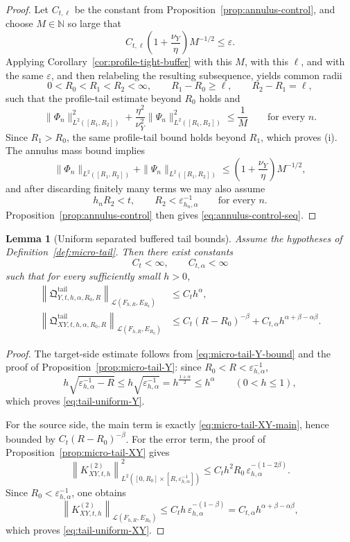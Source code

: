 \documentclass[11pt,a4paper]{amsart}
\theoremstyle{plain}
\newtheorem{lemma}[theorem]{Lemma}
\theoremstyle{definition}
\theoremstyle{remark}
\begin{document}
\begin{proof}
Let \(C_{t,\ell}\) be the constant from Proposition~\ref{prop:annulus-control}, and
choose \(M\in\mathbb N\) so large that
\[
C_{t,\ell}\left(1+\frac{\nu_Y}{\eta}\right)M^{-1/2}\le \varepsilon.
\]
Applying Corollary~\ref{cor:profile-tight-buffer} with this \(M\), with this \(\ell\), and with the
same \(\varepsilon\), and then relabeling the resulting subsequence, yields common radii
\[
0<R_0<R_1<R_2<\infty,
\qquad
R_1-R_0\ge \ell,
\qquad
R_2-R_1=\ell,
\]
such that the profile-tail estimate beyond \(R_0\) holds and
\[
\|\Phi_n\|_{L^2([R_1,R_2])}^2
+
\frac{\eta^2}{\nu_Y^2}
\|\Psi_n\|_{L^2([R_1,R_2])}^2
\le
\frac{1}{M}
\qquad\text{for every }n.
\]
Since \(R_1>R_0\), the same profile-tail bound holds beyond \(R_1\), which proves (i). The
annulus mass bound implies
\[
\|\Phi_n\|_{L^2([R_1,R_2])}
+
\|\Psi_n\|_{L^2([R_1,R_2])}
\le
\left(1+\frac{\nu_Y}{\eta}\right)M^{-1/2},
\]
and after discarding finitely many terms we may also assume
\[
h_nR_2<t,
\qquad
R_2<\varepsilon_{h_n,\alpha}^{-1}
\qquad\text{for every }n.
\]
Proposition~\ref{prop:annulus-control} then gives \eqref{eq:annulus-control-seq}.
\end{proof}

\begin{lemma}[Uniform separated buffered tail bounds]
\label{lem:tail-uniform}
Assume the hypotheses of Definition~\ref{def:micro-tail}. Then there exist constants
\[
C_t<\infty,
\qquad
C_{t,\alpha}<\infty
\]
such that for every sufficiently small \(h>0\),
\begin{align}
\left\|
\mathfrak Q_{Y,t,h,\alpha,R_0,R}^{\mathrm{tail}}
\right\|_{\mathcal L(F_{h,R},E_{R_0})}
&\le
C_t h^\alpha,
\label{eq:tail-uniform-Y}\\
\left\|
\mathfrak Q_{XY,t,h,\alpha,R_0,R}^{\mathrm{tail}}
\right\|_{\mathcal L(F_{h,R},E_{R_0})}
&\le
C_t(R-R_0)^{-\beta}
+
C_{t,\alpha}h^{\alpha+\beta-\alpha\beta}.
\label{eq:tail-uniform-XY}
\end{align}
\end{lemma}

\begin{proof}
The target-side estimate follows from \eqref{eq:micro-tail-Y-bound} and the proof of
Proposition~\ref{prop:micro-tail-Y}: since \(R_0<R<\varepsilon_{h,\alpha}^{-1}\),
\[
h\sqrt{\varepsilon_{h,\alpha}^{-1}-R}
\le
h\sqrt{\varepsilon_{h,\alpha}^{-1}}
=
h^{\frac{1+\alpha}{2}}
\le
h^\alpha
\qquad(0<h\le1),
\]
which proves \eqref{eq:tail-uniform-Y}.

For the source side, the main term is exactly \eqref{eq:micro-tail-XY-main}, hence bounded by
\(C_t(R-R_0)^{-\beta}\). For the error term, the proof of
Proposition~\ref{prop:micro-tail-XY} gives
\[
\left\|
K_{XY,t,h}^{(2)}
\right\|_{L^2([0,R_0]\times[R,\varepsilon_{h,\alpha}^{-1}])}^2
\le
C_t h^2 R_0\,\varepsilon_{h,\alpha}^{-(1-2\beta)}.
\]
Since \(R_0<\varepsilon_{h,\alpha}^{-1}\), one obtains
\[
\left\|
K_{XY,t,h}^{(2)}
\right\|_{\mathcal L(F_{h,R},E_{R_0})}
\le
C_t h\,\varepsilon_{h,\alpha}^{-(1-\beta)}
=
C_{t,\alpha}h^{\alpha+\beta-\alpha\beta},
\]
which proves \eqref{eq:tail-uniform-XY}.
\end{proof}
\end{document}
